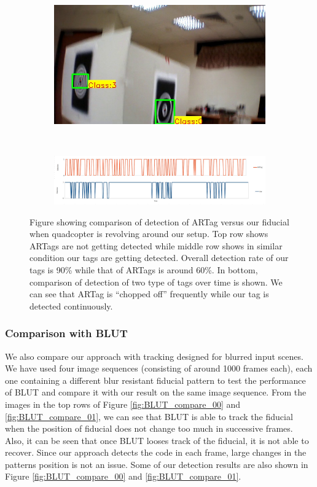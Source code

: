 \documentclass[10pt,twocolumn,letterpaper]{article}
\begin{document}
\begin{figure}
\begin{subfigure}[b]{.19\textwidth}
\end{subfigure}
\begin{subfigure}[b]{.19\textwidth}
\includegraphics[width=\linewidth]{setup_our/output_6/output_943.jpg}
\end{subfigure}\\
\begin{subfigure}[b]{\textwidth}
\includegraphics[width=\linewidth]{compare_detection.jpg}
\end{subfigure}
\caption{Figure showing comparison of detection of ARTag versus our fiducial
when quadcopter is revolving around our setup.
Top row shows ARTags are not getting detected while middle row shows in
similar condition our tags are getting detected. Overall detection rate of our
tags is 90\% while that of ARTags is around 60\%. In bottom, comparison of
detection of two type of tags over time is shown. We can see that ARTag is
``chopped off'' frequently while our tag is detected continuously.}
\label{fig:setup}
\end{figure}


\subsubsection{Comparison with BLUT}

We also compare our approach with tracking designed for blurred input scenes.
We have used four image sequences (consisting of around 1000 frames each), each
one containing a different blur resistant fiducial pattern to test the performance of
BLUT \cite{Wu:2011} and compare it with our result on the same image sequence.
From the images in the top rows of Figure
\ref{fig:BLUT_compare_00} and \ref{fig:BLUT_compare_01}, we can see that BLUT is
able to track the fiducial when the position of fiducial does not change too
much in successive frames. Also, it can be seen that once BLUT looses
track of the fiducial, it is not able to recover. Since our approach detects the
code in each frame, large changes in the patterns position is not an issue.
Some of our detection results are also shown in Figure
\ref{fig:BLUT_compare_00} and \ref{fig:BLUT_compare_01}. 
\end{document}
